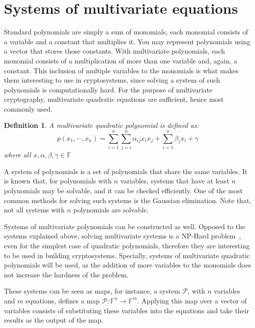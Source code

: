 \documentclass{ufsctex/ufsctex}
\newtheorem{definition}{Definition}
\begin{document}
\section{Systems of multivariate equations}\label{sec:mqsystems}

Standard polynomials are simply a sum of monomials, each monomial consists of a
variable and a constant that multiplies it. You may represent polynomials using
a vector that stores those constants. With multivariate polynomials, each
monomial consists of a multiplication of more than one variable and, again, a
constant. This inclusion of multiple variables to the monomials is what makes
them interesting to use in cryptosystems, since solving a system of such
polynomials is computationally hard. For the purpose of multivariate
cryptography, multivariate quadratic equations are sufficient, hence most
commonly used.

\begin{definition}
A multivariate quadratic polynomial is defined as:
\begin{equation}
p(x_1,\cdots,x_n) = \sum_{i=1}^n \sum_{j=i}^n \alpha_{ij} x_i x_j +
	\sum_{i=1}^n \beta_i x_i + \gamma
\end{equation}
where all $x, \alpha, \beta, \gamma \in \mathbb{F}$
\end{definition}

A system of polynomials is a set of polynomials that share the same variables.
It is known that, for polynomials with $n$ variables, systems that have at
least $n$ polynomials may be solvable, and it can be checked efficiently. One
of the most common methods for solving such systems is the Gaussian
elimination. Note that, not all systems with $n$ polynomials are solvable.

Systems of multivariate polynomials can be constructed as well. Opposed to the
systems explained above, solving multivariate systems is a NP-Hard
problem~\cite{garey1979npc}, even for the simplest case of quadratic
polynomials, therefore they are interesting to be used in building
cryptosystems. Specially, systems of multivariate quadratic polynomials will be
used, as the addition of more variables to the monomials does not increase the
hardness of the problem.

These systems can be seen as maps, for instance, a system $\mathcal{P}$, with
$n$ variables and $m$ equations, defines a map $\mathcal{P}:\mathbb{F}^n \to
\mathbb{F}^m$. Applying this map over a vector of variables consists of
substituting these variables into the equations and take their results as the
output of the map.
\end{document}
